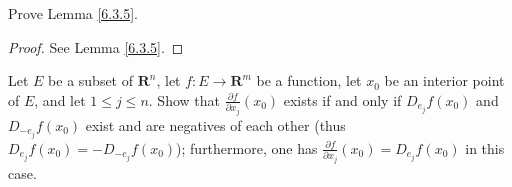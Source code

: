 \exercisesection

\begin{exercise}\label{ex 6.3.1}
    Prove Lemma \ref{6.3.5}.
\end{exercise}

\begin{proof}
    See Lemma \ref{6.3.5}.
\end{proof}

\begin{exercise}\label{ex 6.3.2}
    Let \(E\) be a subset of \(\mathbf{R}^n\), let \(f : E \to \mathbf{R}^m\) be a function, let \(x_0\) be an interior point of \(E\), and let \(1 \leq j \leq n\).
    Show that \(\frac{\partial f}{\partial x_j}(x_0)\) exists if and only if \(D_{e_j} f(x_0)\) and \(D_{-e_j} f(x_0)\) exist and are negatives of each other
    (thus \(D_{e_j} f(x_0) = -D_{-e_j} f(x_0)\));
    furthermore, one has \(\frac{\partial f}{\partial x_j}(x_0) = D_{e_j} f(x_0)\) in this case.
\end{exercise}

